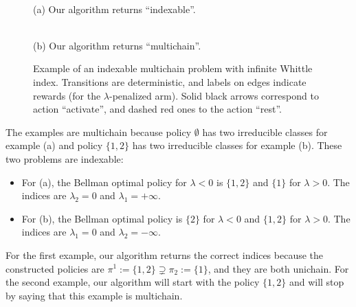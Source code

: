 \begin{figure}[ht]
    \centering
    \begin{minipage}{.35\linewidth}
        \centering
        \\
        (a) Our algorithm returns ``indexable''.
    \end{minipage}\qquad 
    \begin{minipage}{.35\linewidth}
        \centering
        \\
        (b) Our algorithm returns ``multichain''.
    \end{minipage}
    
    \caption{Example of an indexable multichain problem with infinite Whittle index. Transitions are deterministic, and labels on edges indicate rewards (for the $\lambda$-penalized arm). Solid black arrows correspond to action ``activate'', and dashed red ones to the action ``rest''.}
    \label{fig:example_multichain}
\end{figure} 
The examples are multichain because policy $\emptyset$ has two irreducible classes for example (a) and policy $\{1,2\}$ has two irreducible classes for example (b). These two problems are indexable:
\begin{itemize}
    \item For (a), the Bellman optimal policy for $\lambda<0$ is $\{1,2\}$ and $\{1\}$ for $\lambda>0$. The indices are $\lambda_2=0$ and $\lambda_1=+\infty$.
    \item For (b), the  Bellman optimal policy is $\{2\}$ for $\lambda<0$  and $\{1,2\}$ for $\lambda>0$. The indices are $\lambda_1=0$ and $\lambda_2=-\infty$.
\end{itemize}
For the first example, our algorithm returns the correct indices because the constructed policies are $\pi^1:=\{1,2\}\supsetneq\pi_2:=\{1\}$, and they are both unichain.  For the second example, our algorithm will start with the policy $\{1,2\}$ and will stop by saying that this example is multichain.

